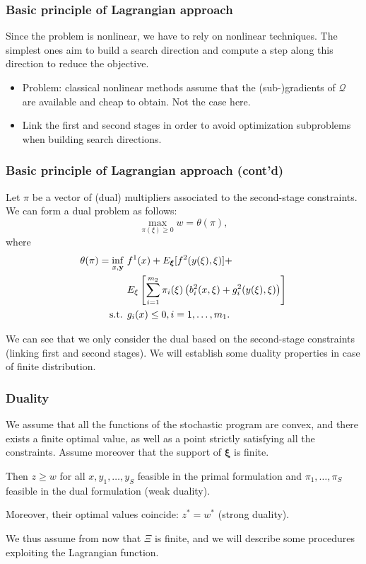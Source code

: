 \documentclass[french]{beamer}
\def\bxi{\boldsymbol\xi}
\begin{document}
\begin{frame}
\frametitle{Basic principle of Lagrangian approach}

Since the problem is nonlinear, we have to rely on nonlinear techniques.
The simplest ones aim to build a search direction and compute a step along this direction to reduce the objective.

\begin{itemize}
\item
Problem: classical nonlinear methods assume that the (sub-)gradients of $\mathcal{Q}$ are available and cheap to obtain.
Not the case here.
\item
Link the first and second stages in order to avoid optimization subproblems when building search directions.
\end{itemize}

\end{frame}

\begin{frame}
\frametitle{Basic principle of Lagrangian approach (cont'd)}

Let $\pi$ be a vector of (dual) multipliers associated to the second-stage constraints.
We can form a dual problem as follows:
\[
\max_{\pi(\xi) \geq 0} w = \theta(\pi),
\]
where
\begin{align*}
\theta(\pi) = \inf_{x, {\bf y}}\ & f^1(x)+E_{\bxi} [f^2(y(\xi),\xi)] + \\
& E_{\xi}\left[\sum_{i=1}^{m_2} \pi_i(\xi) \left( b_i^2(x,\xi) +
  g_i^2(y(\xi), \xi) \right) \right] \\
\text{s.t. } & g_i(x) \leq 0, i=1,\ldots{},m_1.
\end{align*}

We can see that we only consider the dual based on the second-stage constraints (linking first and second stages).
We will establish some duality properties in case of finite distribution.

\end{frame}

\begin{frame}
\frametitle{Duality}

\begin{theorem}
We assume that all the functions of the stochastic program are convex,
and there exists a finite optimal value, as well as a point strictly satisfying all the constraints.
Assume moreover that the support of $\bxi$ is finite.

\mbox{}

Then $z \geq w$ for all $x, y_1,\ldots{},y_S$ feasible in the primal formulation and $\pi_1,\ldots{},\pi_S$ feasible in the dual formulation (weak duality).

\mbox{}

Moreover, their optimal values coincide: $z^* = w^*$ (strong duality).
\end{theorem}

\mbox{}

We thus assume from now that {\red $\Xi$ is finite}, and we will describe some procedures exploiting the Lagrangian function.

\end{frame}
\end{document}
